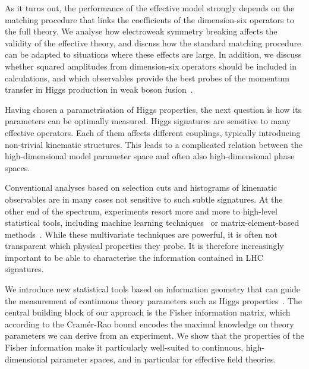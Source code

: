 As it turns out, the performance of the effective model strongly
depends on the matching procedure that links the coefficients of the
dimension-six operators to the full theory. We analyse how electroweak
symmetry breaking affects the validity of the effective theory, and
discuss how the standard matching procedure can be adapted to
situations where these effects are large. In addition, we discuss
whether squared amplitudes from dimension-six operators should be
included in calculations, and which observables provide the best
probes of the momentum transfer in Higgs production in weak boson
fusion~\cite{Biekotter:2016ecg}.

\newparagraph
%
Having chosen a parametrisation of Higgs properties, the next question
is how its parameters can be optimally measured. Higgs signatures are
sensitive to many effective operators. Each of them affects different
couplings, typically introducing non-trivial kinematic
structures. This leads to a complicated relation between the
high-dimensional model parameter space and often also high-dimensional
phase spaces.

Conventional analyses based on selection cuts and histograms of
kinematic observables are in many cases not sensitive to such subtle
signatures.  At the other end of the spectrum, experiments resort more
and more to high-level statistical tools, including machine learning
techniques~\cite{Cranmer:2015bka, Louppe:2016ylz, Louppe:2016aov,
  Cranmer:2016lzt, Baldi:2016fzo, Brehmer:ghost_probability,
  Cogan:2014oua, Baldi:2014pta, deOliveira:2015xxd, Almeida:2015jua,
  Baldi:2016fql, Guest:2016iqz, Komiske:2016rsd, Kasieczka:2017nvn,
  Louppe:2017ipp, Baldi:2014kfa, Searcy:2015apa, Santos:2016kno,
  Alves:2016htj, Buckley:2011kc, Bornhauser:2013aya, Bechtle:2017vyu}
or matrix-element-based methods~\cite{Kondo:1988yd, Abazov:2004cs,
  Gao:2010qx, Alwall:2010cq, Avery:2012um, Andersen:2012kn,
  Campbell:2013hz, Artoisenet:2013vfa, Martini:2015fsa,
  Gritsan:2016hjl, Soper:2011cr, Soper:2012pb, Soper:2014rya,
  Atwood:1991ka, Davier:1992nw, Diehl:1993br}. While these
multivariate techniques are powerful, it is often not transparent
which physical properties they probe. It is therefore increasingly
important to be able to characterise the information contained in LHC
signatures.

We introduce new statistical tools based on information geometry that
can guide the measurement of continuous theory parameters such as Higgs
properties~\cite{Brehmer:2016nyr}. The central building block of our
approach is the Fisher information matrix, which according to the
Cram\'er-Rao bound encodes the maximal knowledge on theory parameters
we can derive from an experiment. We show that the properties of the
Fisher information make it particularly well-suited to continuous,
high-dimensional parameter spaces, and in particular for effective
field theories.

